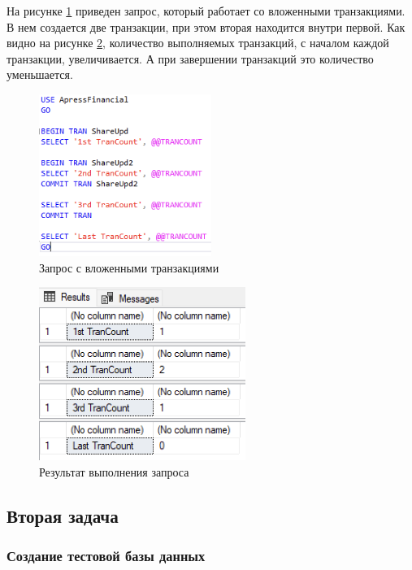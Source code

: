 \documentclass[a4paper, 14pt]{extarticle}
\begin{document}
На рисунке \ref{fig:task-1-5} приведен запрос, который работает со вложенными
транзакциями. В нем создается две транзакции, при этом вторая находится внутри
первой. Как видно на рисунке \ref{fig:task-1-6}, количество выполняемых
транзакций, с началом каждой транзакции, увеличивается. А при завершении
транзакций это количество уменьшается.

\begin{figure}[H]
  \centering
  \includegraphics[width=0.5\textwidth]{images/task-1/5.png}
  \caption{Запрос с вложенными транзакциями}
  \label{fig:task-1-5}
\end{figure}

\begin{figure}[H]
  \centering
  \includegraphics[width=0.6\textwidth]{images/task-1/6.png}
  \caption{Результат выполнения запроса}
  \label{fig:task-1-6}
\end{figure}

\subsection{Вторая задача}

\subsubsection{Создание тестовой базы данных}
\end{document}
